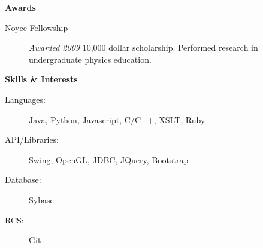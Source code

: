 \documentclass[letterpaper,11pt]{article}
\newcommand{\resheading}[1]{{\large
\colorbox{mygrey}{\begin{minipage}{\textwidth}{\textbf{#1
\vphantom{p\^{E}}}}\end{minipage}}}}
\begin{document}
\resheading{Awards}

\begin{description}
\item[Noyce Fellowship] \emph{Awarded 2009} 10,000 dollar scholarship. Performed research in undergraduate physics education.

\end{description}

\resheading{Skills \& Interests}

\begin{description}
\item[Languages:] Java, Python, Javascript, C/C++, XSLT, Ruby
\item[API/Libraries:] Swing, OpenGL, JDBC, JQuery, Bootstrap
\item[Database:] Sybase
\item[RCS:] Git
\end{description}
\end{document}

